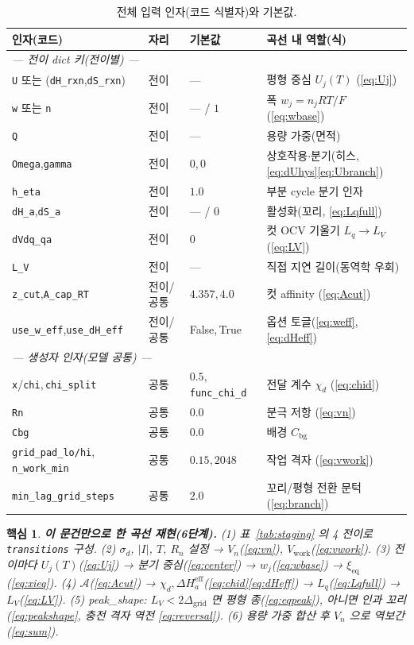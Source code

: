\documentclass[11pt,a4paper]{article}
\newtheorem*{keybox}{핵심}
\newcommand{\eff}{\mathrm{eff}}
\newcommand{\eq}{\mathrm{eq}}
\newcommand{\bg}{\mathrm{bg}}
\newcommand{\work}{\mathrm{work}}
\newcommand{\code}[1]{\texttt{#1}}
\begin{document}
\begin{table}[t]
\centering\footnotesize
\renewcommand{\arraystretch}{1.18}
\caption{전체 입력 인자(코드 식별자)와 기본값.}
\label{tab:inputs}
\begin{tabular}{l l l l}
\toprule
인자(코드) & 자리 & 기본값 & 곡선 내 역할(식) \\
\midrule
\multicolumn{4}{l}{\emph{— 전이 dict 키(전이별) —}}\\
\code{U} 또는 (\code{dH\_rxn},\code{dS\_rxn}) & 전이 & --- & 평형 중심 $U_j(T)$ (\eqref{eq:Uj}) \\
\code{w} 또는 \code{n} & 전이 & --- / $1$ & 폭 $w_j=n_jRT/F$ (\eqref{eq:wbase}) \\
\code{Q} & 전이 & --- & 용량 가중(면적) \\
\code{Omega},\code{gamma} & 전이 & $0$,\,$0$ & 상호작용$\cdot$분기(히스, \eqref{eq:dUhys}\eqref{eq:Ubranch}) \\
\code{h\_eta} & 전이 & $1.0$ & 부분 cycle 분기 인자 \\
\code{dH\_a},\code{dS\_a} & 전이 & --- / $0$ & 활성화(꼬리, \eqref{eq:Lqfull}) \\
\code{dVdq\_qa} & 전이 & $0$ & 컷 OCV 기울기 $L_q\!\to\!L_V$ (\eqref{eq:LV}) \\
\code{L\_V} & 전이 & --- & 직접 지연 길이(동역학 우회) \\
\code{z\_cut},\code{A\_cap\_RT} & 전이/공통 & $4.357$,\,$4.0$ & 컷 affinity (\eqref{eq:Acut}) \\
\code{use\_w\_eff},\code{use\_dH\_eff} & 전이/공통 & False,\,True & 옵션 토글(\eqref{eq:weff},\eqref{eq:dHeff}) \\
\multicolumn{4}{l}{\emph{— 생성자 인자(모델 공통) —}}\\
\code{x}/\code{chi},\,\code{chi\_split} & 공통 & $0.5$,\,\code{func\_chi\_d} & 전달 계수 $\chi_d$ (\eqref{eq:chid}) \\
\code{Rn} & 공통 & $0.0$ & 분극 저항 (\eqref{eq:vn}) \\
\code{Cbg} & 공통 & $0.0$ & 배경 $C_\bg$ \\
\code{grid\_pad\_lo/hi},\,\code{n\_work\_min} & 공통 & $0.15$,\,$2048$ & 작업 격자 (\eqref{eq:vwork}) \\
\code{min\_lag\_grid\_steps} & 공통 & $2.0$ & 꼬리/평형 전환 문턱 (\eqref{eq:branch}) \\
\bottomrule
\end{tabular}
\end{table}

\begin{keybox}
\textbf{이 문건만으로 한 곡선 재현(6단계).}
(1) 표~\ref{tab:staging} 의 4 전이로 \code{transitions} 구성.
(2) $\sigma_d$, $|I|$, $T$, $R_n$ 설정 → $V_n$(\eqref{eq:vn}), $V_\work$(\eqref{eq:vwork}).
(3) 전이마다 $U_j(T)$(\eqref{eq:Uj}) → 분기 중심(\eqref{eq:center}) → $w_j$(\eqref{eq:wbase}) → $\xi_\eq$(\eqref{eq:xieq}).
(4) $\mathcal A$(\eqref{eq:Acut}) → $\chi_d,\Delta H_a^\eff$(\eqref{eq:chid}\eqref{eq:dHeff}) → $L_q$(\eqref{eq:Lqfull}) → $L_V$(\eqref{eq:LV}).
(5) peak\_shape: $L_V<2\Delta_\mathrm{grid}$ 면 평형 종(\eqref{eq:eqpeak}), 아니면 인과 꼬리(\eqref{eq:peakshape}, 충전 격자 역전 \eqref{eq:reversal}).
(6) 용량 가중 합산 후 $V_n$ 으로 역보간(\eqref{eq:sum}).
\end{keybox}
\end{document}
